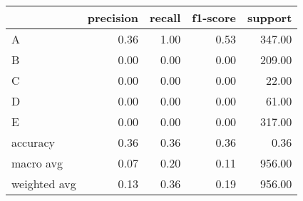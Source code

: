 \begin{tabular}{|l|r|r|r|r|}
\hline
{} &  precision &  recall &  f1-score &  support \\
\hline
A            &       0.36 &    1.00 &      0.53 &   347.00 \\
B            &       0.00 &    0.00 &      0.00 &   209.00 \\
C            &       0.00 &    0.00 &      0.00 &    22.00 \\
D            &       0.00 &    0.00 &      0.00 &    61.00 \\
E            &       0.00 &    0.00 &      0.00 &   317.00 \\
accuracy     &       0.36 &    0.36 &      0.36 &     0.36 \\
macro avg    &       0.07 &    0.20 &      0.11 &   956.00 \\
weighted avg &       0.13 &    0.36 &      0.19 &   956.00 \\
\hline
\end{tabular}
